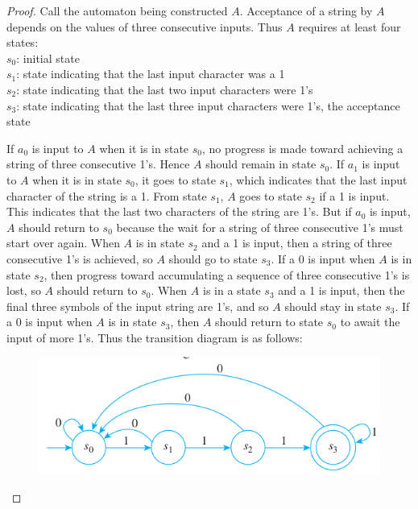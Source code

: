 \documentclass[14pt]{extarticle}
\begin{document}
\begin{proof}
Call the automaton being constructed \(A\). Acceptance of a string by \(A\) depends on the values of three consecutive 
inputs. Thus \(A\) requires at least four states: \\
\(s_0\): initial state \\
\(s_1\): state indicating that the last input character was a 1 \\
\(s_2\): state indicating that the last two input characters were 1’s \\
\(s_3\): state indicating that the last three input characters were 1’s, the acceptance state

If \(a_0\) is input to \(A\) when it is in state \(s_0\), no progress is made toward achieving a string of three 
consecutive 1’s. Hence \(A\) should remain in state \(s_0\). If \(a_1\) is input to \(A\) when it is in state \(s_0\), it 
goes to state \(s_1\), which indicates that the last input 
character of the string is a 1. From state \(s_1\), \(A\) goes to state \(s_2\) if a 1 is input. This indicates that the last 
two characters of the string are 1’s. But if \(a_0\) is input, \(A\) should return to \(s_0\) because the wait for a string 
of three consecutive 1’s must start over again. When \(A\) is in state \(s_2\) and a 1 is input, then a string of three 
consecutive 1’s is achieved, so \(A\) should go to state \(s_3\). If a 0 is input when \(A\) is in state \(s_2\), then 
progress toward accumulating a sequence of three consecutive 1’s is lost, so \(A\) should return to \(s_0\). When \(A\) is 
in a state \(s_3\) and a 1 is input, then the final three symbols of the input string are 1’s, and so \(A\) should stay 
in state \(s_3\). If a 0 is input when \(A\) is in state \(s_3\), then \(A\) should return to state \(s_0\) to await the
input of more 1’s. Thus the transition diagram is as follows:

\begin{figure}[ht!]
\centering
\includegraphics[scale=0.5]{../images/12.2.20.a.png}
\end{figure}
\end{proof}
\end{document}
